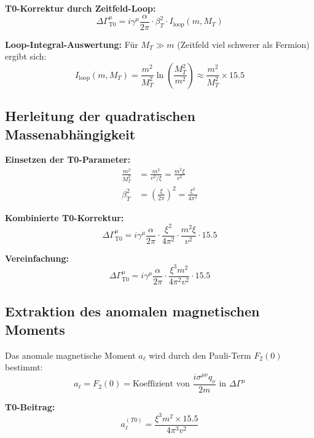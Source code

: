 \documentclass[12pt,a4paper]{article}
\theoremstyle{definition}
\begin{document}
	\textbf{T0-Korrektur durch Zeitfeld-Loop:}
	\begin{equation}
		\Delta\Gamma^\mu_{\text{T0}} = i\gamma^\mu \frac{\alpha}{2\pi} \cdot \beta_T^2 \cdot I_{\text{loop}}(m,M_T)
	\end{equation}
	
	\textbf{Loop-Integral-Auswertung:}
	Für $M_T \gg m$ (Zeitfeld viel schwerer als Fermion) ergibt sich:
	\begin{equation}
		I_{\text{loop}}(m,M_T) = \frac{m^2}{M_T^2} \ln\left(\frac{M_T^2}{m^2}\right) \approx \frac{m^2}{M_T^2} \times 15.5
	\end{equation}
	
	\subsection{Herleitung der quadratischen Massenabhängigkeit}
	
	\textbf{Einsetzen der T0-Parameter:}
	\begin{align}
		\frac{m^2}{M_T^2} &= \frac{m^2}{v^2/\xi} = \frac{m^2 \xi}{v^2}\\
		\beta_T^2 &= \left(\frac{\xi}{2\pi}\right)^2 = \frac{\xi^2}{4\pi^2}
	\end{align}
	
	\textbf{Kombinierte T0-Korrektur:}
	\begin{equation}
		\Delta\Gamma^\mu_{\text{T0}} = i\gamma^\mu \frac{\alpha}{2\pi} \cdot \frac{\xi^2}{4\pi^2} \cdot \frac{m^2 \xi}{v^2} \cdot 15.5
	\end{equation}
	
	\textbf{Vereinfachung:}
	\begin{equation}
		\Delta\Gamma^\mu_{\text{T0}} = i\gamma^\mu \frac{\alpha}{2\pi} \cdot \frac{\xi^3 m^2}{4\pi^2 v^2} \cdot 15.5
	\end{equation}
	
	\subsection{Extraktion des anomalen magnetischen Moments}
	
	Das anomale magnetische Moment $a_\ell$ wird durch den Pauli-Term $F_2(0)$ bestimmt:
	\begin{equation}
		a_\ell = F_2(0) = \text{Koeffizient von } \frac{i\sigma^{\mu\nu}q_\nu}{2m} \text{ in } \Delta\Gamma^\mu
	\end{equation}
	
	\textbf{T0-Beitrag:}
	\begin{equation}
		a_\ell^{(T0)} = \frac{\xi^3 m^2 \times 15.5}{4\pi^3 v^2}
	\end{equation}
	
\end{document}
